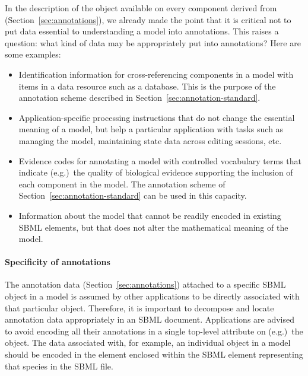 In the description of the \Annotation object available on every
component derived from \SBase (Section~\ref{sec:annotations}), we
already made the point that it is critical not to put data
essential to understanding a model into annotations.  This raises
a question: what kind of data may be appropriately put into
annotations?  Here are some examples:
\begin{itemize}

\item Identification information for cross-referencing components
  in a model with items in a data resource such as a database.
  This is the purpose of the annotation scheme described in
  Section~\ref{sec:annotation-standard}.

\item Application-specific processing instructions that do not
  change the essential meaning of a model, but help a particular
  application with tasks such as managing the model, maintaining
  state data across editing sessions, etc.

\item Evidence codes for annotating a model with controlled
  vocabulary terms that indicate (e.g.)\ the quality of biological
  evidence supporting the inclusion of each component in the
  model.  The annotation scheme of
  Section~\ref{sec:annotation-standard} can be used in this
  capacity.

\item Information about the model that cannot be readily encoded
  in existing SBML elements, but that does not alter the
  mathematical meaning of the model.

\end{itemize}


\paragraph{Specificity of annotations}

The annotation data (Section~\ref{sec:annotations}) attached to a
specific SBML object in a model is assumed by other applications
to be directly associated with that particular object.  Therefore,
it is important to decompose and locate annotation data
appropriately in an SBML document.  Applications are advised to
avoid encoding all their annotations in a single top-level
attribute on (e.g.)\ the \Model object.  The data associated with,
for example, an individual \Species object in a model should be
encoded in the  element enclosed within the
SBML  element representing that species in the
SBML file.


